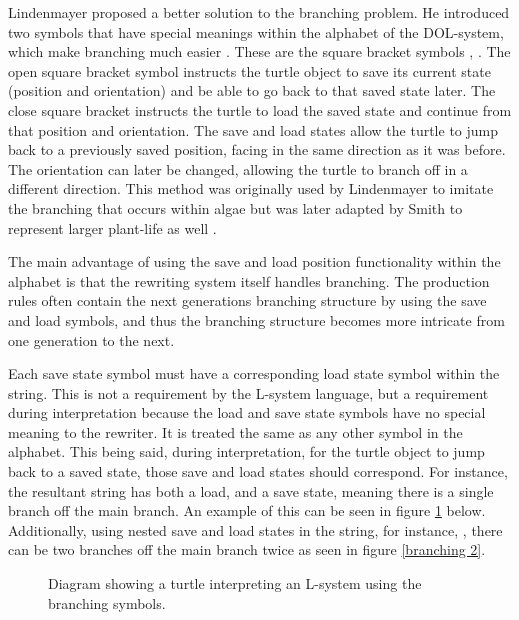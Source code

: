Lindenmayer proposed a better solution to the branching problem. He introduced two symbols that have special meanings within the alphabet of the DOL-system, which make branching much easier \cite{lindenmayer1968mathematical}. These are the square bracket symbols \say{[}, \say{]}. The open square bracket \say{[} symbol instructs the turtle object to save its current state (position and orientation) and be able to go back to that saved state later. The close square bracket \say{]} instructs the turtle to load the saved state and continue from that position and orientation. The save and load states allow the turtle to jump back to a previously saved position, facing in the same direction as it was before. The orientation can later be changed, allowing the turtle to branch off in a different direction. This method was originally used by Lindenmayer to imitate the branching that occurs within algae but was later adapted by Smith to represent larger plant-life as well \cite{smith1984plants}.
 
The main advantage of using the save and load position functionality within the alphabet is that the rewriting system itself handles branching. The production rules often contain the next generations branching structure by using the save and load symbols, and thus the branching structure becomes more intricate from one generation to the next.

Each save state symbol must have a corresponding load state symbol within the string. This is not a requirement by the L-system language, but a requirement during interpretation because the load and save state symbols have no special meaning to the rewriter. It is treated the same as any other symbol in the alphabet. This being said, during interpretation, for the turtle object to jump back to a saved state, those save and load states should correspond. For instance, the resultant string  has both a load, and a save state, meaning there is a single branch off the main branch. An example of this can be seen in figure \ref{branching 1} below. Additionally, using nested save and load states in the string, for instance, , there can be two branches off the main branch twice as seen in figure \ref{branching 2}.

\begin{figure}[htbp]
	{\centering
		\setlength{\fboxrule}{1pt}
		\vspace{7px}
		\caption{Diagram showing a turtle interpreting an L-system using the branching symbols.} \label{branching 1}
	}
\end{figure}
\FloatBarrier


